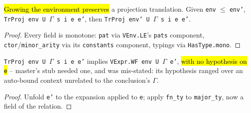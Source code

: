 \begin{theorem}
\label{thm:trproj-mono}
\leanok
{}
 

 \hl{Growing the environment preserves} a projection translation. Given \texttt{env} $\le$ \texttt{env'}, \texttt{TrProj env U $\Gamma$ s i e e'}, then \texttt{TrProj env' U $\Gamma$ s i e e'}.
\end{theorem}
\begin{proof}
\leanok
{} Every field is monotone: \texttt{pat} via \texttt{VEnv.LE}'s \texttt{pats} component, \texttt{ctor}/\texttt{minor\_arity} via its \texttt{constants} component, typings via \texttt{HasType.mono}.
\end{proof}

\begin{theorem}
\label{thm:trproj-wf}
\leanok
{}
 

 \texttt{TrProj env U $\Gamma$ s i e e'} implies \texttt{VExpr.WF env U $\Gamma$ e'}, \hl{with no hypothesis on \texttt{e}} -- master's stub needed one, and was mis-stated: its hypothesis ranged over an auto-bound context unrelated to the conclusion's $\Gamma$.
\end{theorem}
\begin{proof}
\leanok
{} Unfold \texttt{e'} to the expansion applied to \texttt{e}; apply \texttt{fn\_ty} to \texttt{major\_ty}, now a field of the relation.
\end{proof}

